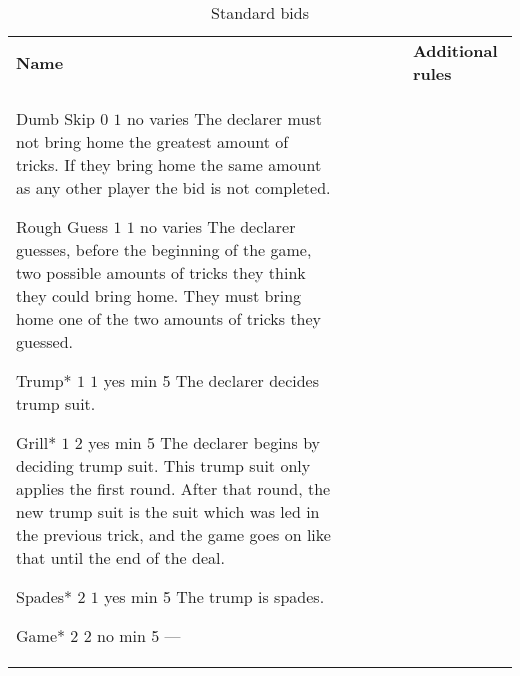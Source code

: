 %
%
%

\begin{table}
	\caption{Standard bids}\label{tab:standardBids}
	\begin{center}
		\begin{tabularx}{\textwidth}{lcccc|X}
				\textbf{Name} &
				\rotccw{\textbf{Worth}} &
				\rotccw{\textbf{Score}} &
				\rotccw{\textbf{Trump}} &
				\rotccw{\textbf{Tricks}} &
				\textbf{Additional rules}
				\\[-3ex]

				\standardBidItem%
				{Dumb Skip}
				{$0$}
				{$1$}
				{no}
				{varies}
				{%
					The declarer must not bring home the greatest amount of tricks. If they bring home the same amount as any other player the bid is not completed.
				}

				\standardBidItem%
				{Rough Guess}
				{$1$}
				{$1$}
				{no}
				{varies}
				{%
					The declarer guesses, before the beginning of the game, two possible amounts of tricks they think they could bring home. They must bring home one of the two amounts of tricks they guessed.
				}

				\standardBidItem%
				{Trump*}
				{$1$}
				{$1$}
				{yes}
				{min 5}
				{%
					The declarer decides trump suit.
				}

				\standardBidItem%
				{Grill*}
				{$1$}
				{$2$}
				{yes}
				{min 5}
				{%
					The declarer begins by deciding trump suit. This trump suit only applies the first round. After that round, the new trump suit is the suit which was led in the previous trick, and the game goes on like that until the end of the deal.
				}
				
				\standardBidItem%
				{Spades*}
				{$2$}
				{$1$}
				{yes}
				{min 5}
				{%
					The trump is spades.
				}

				\standardBidItem%
				{Game*}
				{$2$}
				{$2$}
				{no}
				{min 5}
				{%
					---
				}


\end{tabularx}
\end{center}
\end{table}
